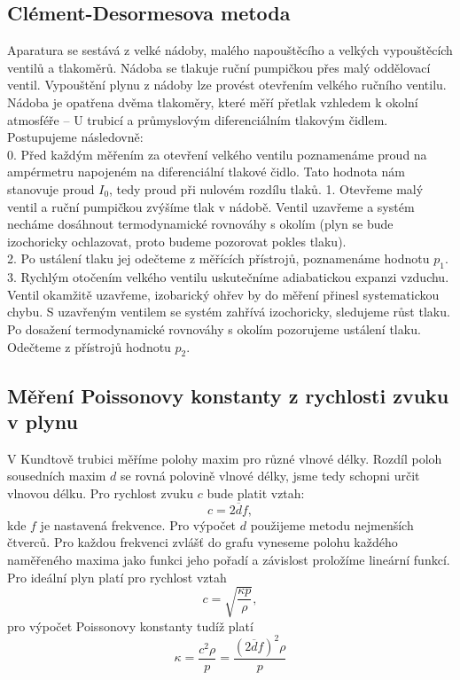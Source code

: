 \documentclass[czech,11pt,a4paper]{article}
\begin{document}
		\subsection{Clément-Desormesova metoda}
			Aparatura se sestává z velké nádoby, malého napouštěcího a velkých vypouštěcích ventilů a tlakoměrů. Nádoba se tlakuje	ruční pumpičkou přes malý oddělovací ventil. Vypouštění plynu z nádoby lze provést otevřením
			velkého ručního ventilu. Nádoba je opatřena dvěma tlakoměry, které měří přetlak vzhledem k okolní atmosféře – U trubicí a průmyslovým diferenciálním tlakovým čidlem. Postupujeme následovně:\\
			0.	Před každým měřením za otevření velkého ventilu poznamenáme proud na ampérmetru napojeném na diferenciální tlakové čidlo. Tato hodnota nám stanovuje proud $I_0$, tedy proud při nulovém rozdílu tlaků.
			1.	Otevřeme malý ventil a ruční pumpičkou zvýšíme tlak v nádobě. Ventil uzavřeme a systém necháme dosáhnout termodynamické rovnováhy s okolím (plyn se bude izochoricky ochlazovat, proto budeme pozorovat pokles tlaku).\\
			2.	Po ustálení tlaku jej odečteme z měřících přístrojů, poznamenáme hodnotu $p_1$.\\
			3.	Rychlým otočením velkého ventilu uskutečníme adiabatickou expanzi vzduchu. Ventil okamžitě uzavřeme, izobarický ohřev by do měření přinesl systematickou chybu. S uzavřeným ventilem se systém zahřívá izochoricky, sledujeme růst tlaku. Po dosažení termodynamické rovnováhy s okolím pozorujeme ustálení tlaku. Odečteme z přístrojů hodnotu $p_2$.\\
			
		\subsection{Měření Poissonovy konstanty z rychlosti zvuku v plynu}
		V Kundtově trubici měříme polohy maxim pro různé vlnové délky. Rozdíl poloh sousedních maxim $d$ se rovná polovině vlnové délky, jsme tedy schopni určit vlnovou délku. Pro rychlost zvuku $c$ bude platit vztah:
		\begin{equation}
			c = 2 \overline{d}f,
		\end{equation}
		kde $f$ je nastavená frekvence.
		Pro výpočet $d$ použijeme metodu nejmenších čtverců. Pro každou frekvenci zvlášť do grafu vyneseme polohu každého naměřeného maxima jako funkci jeho pořadí a závislost	proložíme lineární funkcí.
		Pro ideální plyn platí pro rychlost vztah
		\begin{equation}
			c = \sqrt{\frac{\kappa p}{\rho}},
		\end{equation}
		pro výpočet Poissonovy konstanty tudíž platí
		\begin{equation}
			\kappa = \frac{c^2 \rho}{p} = \frac {{(2\overline{d}f)}^2 \rho}p
		\end{equation}
\end{document}

